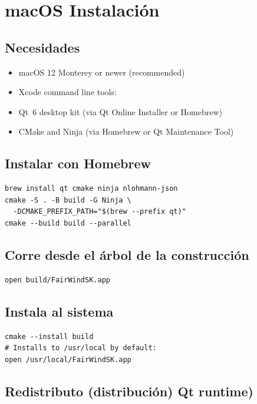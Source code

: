 \section{macOS Instalación}
\label{app:macos}

\subsection{Necesidades}

\begin{itemize}
  \item macOS 12 Monterey or newer (recommended)
  \item Xcode command line tools: 
  \item Qt~6 desktop kit (via Qt Online Installer or Homebrew)
  \item CMake and Ninja (via Homebrew or Qt Maintenance Tool)
\end{itemize}

\subsection{Instalar con Homebrew}

\begin{lstlisting}
brew install qt cmake ninja nlohmann-json
cmake -S . -B build -G Ninja \
  -DCMAKE_PREFIX_PATH="$(brew --prefix qt)"
cmake --build build --parallel
\end{lstlisting}

\subsection{Corre desde el árbol de la construcción}

\begin{lstlisting}
open build/FairWindSK.app
\end{lstlisting}

\subsection{Instala al sistema}

\begin{lstlisting}
cmake --install build
# Installs to /usr/local by default:
open /usr/local/FairWindSK.app
\end{lstlisting}

\subsection{Redistributo (distribución) Qt runtime)}

